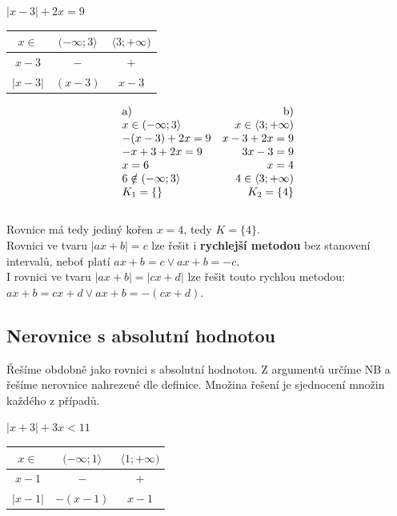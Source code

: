 \documentclass[12pt, a4paper]{article}
\begin{document}
\begin{center}
$|x-3| + 2x = 9$\\
\begin{tabular}{| c | c | c |}
\hline
$x \in $ & $(-\infty; 3 \rangle$ & $\langle 3; +\infty)$\\
\hline
$x-3$ & $-$ & $+$\\
\hline
$|x-3|$ & $(x-3)$ & $x-3$\\
\hline
\end{tabular}
\end{center}

\[
    \begin{array}{ll}
        \text{a)} & \hfill \text{b)}\\
         x \in (-\infty; 3 \rangle & \hfill x \in \langle 3; +\infty)\\
        -(x-3) + 2x = 9 & \hfill x - 3 + 2x = 9\\
        -x+ 3 + 2x = 9 & \hfill 3x - 3 = 9\\
        x = 6 & \hfill x = 4\\
        6 \notin (-\infty; 3 \rangle & \hfill 4 \in \langle 3; +\infty)\\
        K_1 = \{\} & \hfill K_2 = \{4\}\\
    \end{array}
\]\\
Rovnice má tedy jediný kořen $x=4$, tedy $K=\{4\}$.\\

Rovnici ve tvaru $|ax+b|=c$  lze řešit i \textbf{rychlejší metodou} bez stanovení intervalů, neboť platí $ax+b=c \lor ax+b=-c$.\\
I rovnici ve tvaru $|ax+b|=|cx+d|$ lze řešit touto rychlou metodou: $ax+b = cx+d \lor ax+b=-(cx+d)$.\\

\subsection*{Nerovnice s absolutní hodnotou}
Řešíme obdobně jako rovnici s absolutní hodnotou. Z argumentů určíme NB a řešíme nerovnice nahrezené dle definice. Množina řešení je sjednocení množin každého z případů.\\

\begin{center}
$|x+3|+3x<11$\\
\begin{tabular}{| c | c | c |}
\hline
$ x \in $ & $ (-\infty; 1 \rangle $ & $ \langle 1; + \infty) $\\
\hline
$x-1$ & $-$ & $+$\\
\hline
$|x-1|$ & $-(x-1)$ & $x-1$\\
\hline
\end{tabular}
\end{center}
\end{document}
